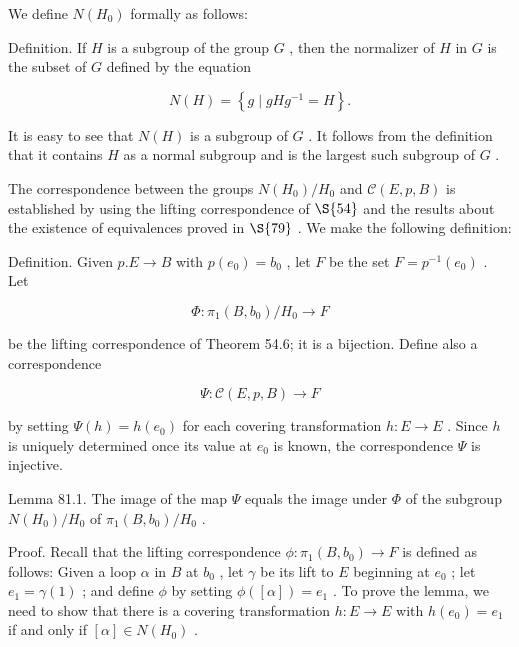 We define \(N\left( {H}_{0}\right)\) formally as follows:

Definition. If \(H\) is a subgroup of the group \(G\) , then the normalizer of \(H\) in \(G\) is the subset of \(G\) defined by the equation

\[
N\left( H\right)  = \left\{  {g \mid  {gH}{g}^{-1} = H}\right\}  .
\]

It is easy to see that \(N\left( H\right)\) is a subgroup of \(G\) . It follows from the definition that it contains \(H\) as a normal subgroup and is the largest such subgroup of \(G\) .

The correspondence between the groups \(N\left( {H}_{0}\right) /{H}_{0}\) and \(\mathcal{C}\left( {E,p,B}\right)\) is established by using the lifting correspondence of \( \S {54}\) and the results about the existence of equivalences proved in \( \S {79}\) . We make the following definition:

Definition. Given \(p.E \rightarrow  B\) with \(p\left( {e}_{0}\right)  = {b}_{0}\) , let \(F\) be the set \(F = {p}^{-1}\left( {e}_{0}\right)\) . Let

\[
\Phi  : {\pi }_{1}\left( {B,{b}_{0}}\right) /{H}_{0} \rightarrow  F
\]

be the lifting correspondence of Theorem 54.6; it is a bijection. Define also a correspondence

\[
\Psi  : \mathcal{C}\left( {E,p,B}\right)  \rightarrow  F
\]

by setting \(\Psi \left( h\right)  = h\left( {e}_{0}\right)\) for each covering transformation \(h : E \rightarrow  E\) . Since \(h\) is uniquely determined once its value at \({e}_{0}\) is known, the correspondence \(\Psi\) is injective.

Lemma 81.1. The image of the map \(\Psi\) equals the image under \(\Phi\) of the subgroup \(N\left( {H}_{0}\right) /{H}_{0}\) of \({\pi }_{1}\left( {B,{b}_{0}}\right) /{H}_{0}\) .

Proof. Recall that the lifting correspondence \(\phi  : {\pi }_{1}\left( {B,{b}_{0}}\right)  \rightarrow  F\) is defined as follows: Given a loop \(\alpha\) in \(B\) at \({b}_{0}\) , let \(\gamma\) be its lift to \(E\) beginning at \({e}_{0}\) ; let \({e}_{1} = \gamma \left( 1\right)\) ; and define \(\phi\) by setting \(\phi \left( \left\lbrack  \alpha \right\rbrack  \right)  = {e}_{1}\) . To prove the lemma, we need to show that there is a covering transformation \(h : E \rightarrow  E\) with \(h\left( {e}_{0}\right)  = {e}_{1}\) if and only if \(\left\lbrack  \alpha \right\rbrack   \in  N\left( {H}_{0}\right)\) .


